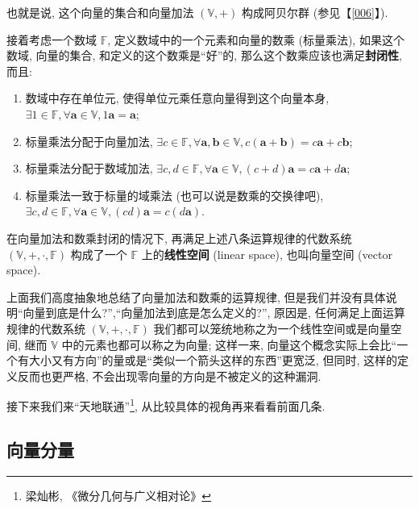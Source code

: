 \begin{newquote}
也就是说, 这个向量的集合和向量加法 $(\mathbb{V},+)$ 构成阿贝尔群
(参见【\ref{006}】).
\end{newquote}

接着考虑一个数域 $\mathbb{F}$, 定义数域中的一个元素和向量的数乘
(标量乘法), 如果这个数域, 向量的集合, 和定义的这个数乘是``好''的,
那么这个数乘应该也满足\textbf{封闭性}, 而且:

\begin{enumerate}
\def\labelenumi{\arabic{enumi}.}
\setcounter{enumi}{4}
\item
  数域中存在单位元, 使得单位元乘任意向量得到这个向量本身,
  $\exists 1\in\mathbb{F},\forall\boldsymbol{a}\in\mathbb{V},1\boldsymbol{a}=\boldsymbol{a}$;
\item
  标量乘法分配于向量加法,
  $\exists c\in\mathbb{F},\forall\boldsymbol{a},\boldsymbol{b}\in\mathbb{V},c(\boldsymbol{a}+\boldsymbol{b})=c\boldsymbol{a}+c\boldsymbol{b}$;
\item
  标量乘法分配于数域加法,
  $\exists c,d\in\mathbb{F},\forall\boldsymbol{a}\in\mathbb{V},(c+d)\boldsymbol{a}=c\boldsymbol{a}+d\boldsymbol{a}$;
\item
  标量乘法一致于标量的域乘法 (也可以说是数乘的交换律吧),
  $\exists c,d\in\mathbb{F},\forall\boldsymbol{a}\in\mathbb{V},(cd)\boldsymbol{a}=c(d\boldsymbol{a})$.
\end{enumerate}

\begin{newquote}
在向量加法和数乘封闭的情况下, 再满足上述八条运算规律的代数系统
$(\mathbb{V},+,\cdot,\mathbb{F})$ 构成了一个 $\mathbb{F}$
上的\textbf{线性空间} (linear space), 也叫向量空间 (vector space).
\end{newquote}

上面我们高度抽象地总结了向量加法和数乘的运算规律,
但是我们并没有具体说明``向量到底是什么?'',``向量加法到底是怎么定义的?'',
原因是, 任何满足上面运算规律的代数系统
$(\mathbb{V},+,\cdot,\mathbb{F})$
我们都可以笼统地称之为一个线性空间或是向量空间, 继而 $\mathbb{V}$
中的元素也都可以称之为向量; 这样一来,
向量这个概念实际上会比``一个有大小又有方向''的量或是``类似一个箭头这样的东西''更宽泛,
但同时, 这样的定义反而也更严格,
不会出现零向量的方向是不被定义的这种漏洞.

接下来我们来``天地联通''\footnote{梁灿彬, 《微分几何与广义相对论》},
从比较具体的视角再来看看前面几条.

\subsection{向量分量}


